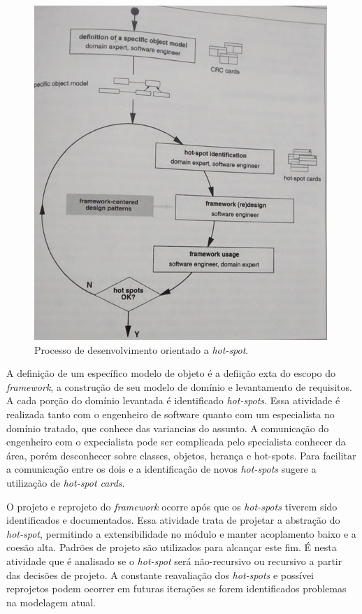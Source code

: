 \begin{figure}[h]
	\centering
	\label{fig15}
		\includegraphics[keepaspectratio=true,scale=0.4]{figuras/hotspotdd.jpg}
	\caption{Processo de desenvolvimento orientado a \textit{hot-spot}. \cite{Fayad1999}}
\end{figure}

A definição de um específico modelo de objeto é a defiição exta do escopo do \textit{framework}, a construção de seu modelo de domínio e levantamento de requisitos. A cada porção do domínio levantada é identificado \textit{hot-spots}. Essa atividade é realizada tanto com o engenheiro de software quanto com um especialista no domínio tratado, que conhece das variancias do assunto. A comunicação do engenheiro com o expecialista pode ser complicada pelo specialista conhecer da área, porém desconhecer sobre classes, objetos, herança e hot-spots. Para facilitar a comunicação entre os dois e a identificação de novos \textit{hot-spots} \cite{Fayad1999} sugere a utilização de \textit{hot-spot cards}.

O projeto e reprojeto do \textit{framework} ocorre após que os \textit{hot-spots} tiverem sido identificados e documentados. Essa atividade trata de projetar a abstração do \textit{hot-spot}, permitindo a extensibilidade no módulo e manter acoplamento baixo e a coesão alta. Padrões de projeto são utilizados para alcançar este fim. É nesta atividade que é analisado se o \textit{hot-spot} será não-recursivo ou recursivo a partir das decisões de projeto. A constante reavaliação dos \textit{hot-spots} e possívei reprojetos podem ocorrer em futuras iterações se forem identificados problemas na modelagem atual.

